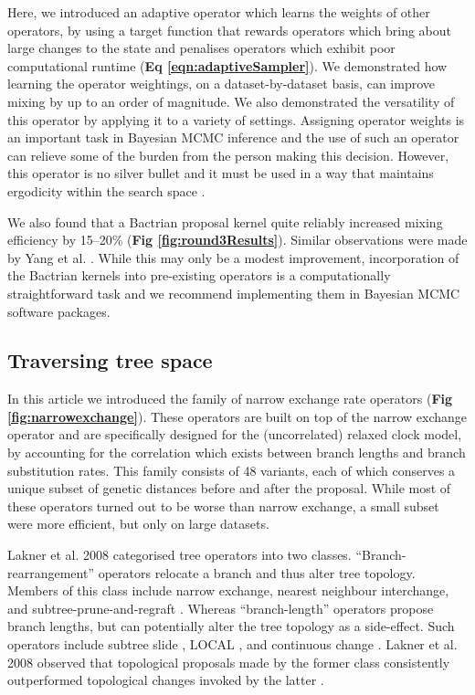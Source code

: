 \documentclass[10pt,letterpaper]{article}
\begin{document}
Here, we introduced an adaptive operator which learns the weights of other operators, by using a target function that rewards operators which bring about large changes to the state and penalises operators which exhibit poor computational runtime (\textbf{Eq \ref{eqn:adaptiveSampler}}).
We demonstrated how learning the operator weightings, on a dataset-by-dataset basis, can improve mixing by up to an order of magnitude.
We also demonstrated the versatility of this operator by applying it to a variety of settings.
Assigning operator weights is an important task in Bayesian MCMC inference and the use of such an operator can relieve some of the burden from the person making this decision.
However, this operator is no silver bullet and it must be used in a way that maintains ergodicity within the search space \cite{roberts2007coupling}.


We also found that a Bactrian proposal kernel quite reliably increased mixing efficiency by 15--20\% (\textbf{Fig \ref{fig:round3Results}}).
Similar observations were made by Yang et al. \cite{yang2013searching}.
While this may only be a modest improvement, incorporation of the Bactrian kernels into pre-existing operators is a computationally straightforward task and we recommend implementing them in Bayesian MCMC software packages.

	
	
	

\subsection*{Traversing tree space}


In this article we introduced the family of narrow exchange rate operators (\textbf{Fig \ref{fig:narrowexchange}}).
These operators are built on top of the narrow exchange operator and are specifically designed for the (uncorrelated) relaxed clock model, by accounting for the correlation which exists between branch lengths and branch substitution rates. 
This family consists of 48 variants, each of which conserves a unique subset of genetic distances before and after the proposal. 
While most of these operators turned out to be worse than narrow exchange, a small subset were more efficient, but only on large datasets.  


Lakner et al. 2008 categorised tree operators into two classes.
``Branch-rearrangement'' operators relocate a branch and thus alter tree topology. 
Members of this class include narrow exchange, nearest neighbour interchange, and subtree-prune-and-regraft \cite{semple2003phylogenetics}.
Whereas ``branch-length'' operators propose branch lengths, but can potentially alter the tree topology as a side-effect.
 Such operators include subtree slide \cite{hohna2008clock}, LOCAL \cite{simon1998local}, and continuous change \cite{jow2002bayesian}.
Lakner et al. 2008 observed that topological proposals made by the former class consistently outperformed topological changes invoked by the latter  \cite{lakner2008efficiency}.
\end{document}
